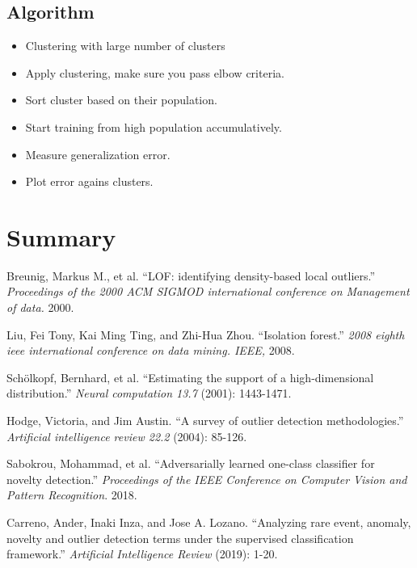 \documentclass{article}
\begin{document}
\subsection{Algorithm}
\begin{itemize}
\item Clustering with large number of clusters
\item Apply clustering, make sure you pass elbow criteria.
\item Sort cluster based on their population.
\item Start training from high population accumulatively.
\item Measure generalization error.
\item Plot error agains clusters.
\end{itemize}

\section{Summary}


\begin{thebibliography}{10}

 Breunig, Markus M., et al. ``LOF: identifying density-based local outliers.'' {\em Proceedings of the 2000 ACM SIGMOD international conference on Management of data.} 2000.
  
 Liu, Fei Tony, Kai Ming Ting, and Zhi-Hua Zhou. ``Isolation forest.'' {\em 2008 eighth ieee international conference on data mining. IEEE,} 2008.

 Sch\"{o}lkopf, Bernhard, et al. ``Estimating the support of a high-dimensional distribution.'' {\em Neural computation 13.7} (2001): 1443-1471.

  Hodge, Victoria, and Jim Austin. ``A survey of outlier detection methodologies.'' {\em Artificial intelligence review 22.2} (2004): 85-126.

 Sabokrou, Mohammad, et al. ``Adversarially learned one-class classifier for novelty detection.'' {\em Proceedings of the IEEE Conference on Computer Vision and Pattern Recognition}. 2018.

 Carreno, Ander, Inaki Inza, and Jose A. Lozano. ``Analyzing rare event, anomaly, novelty and outlier detection terms under the supervised classification framework.'' {\em Artificial Intelligence Review} (2019): 1-20.
\end{thebibliography}
\end{document}
